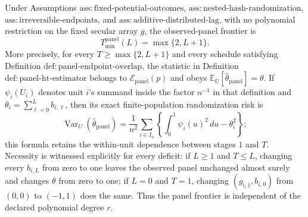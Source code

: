 Under Assumptions \(\mathrm{ass:fixed\text{-}potential\text{-}outcomes}\), \(\mathrm{ass:nested\text{-}hash\text{-}randomization}\), \(\mathrm{ass:irreversible\text{-}endpoints}\), and \(\mathrm{ass:additive\text{-}distributed\text{-}lag}\), with no polynomial restriction on the fixed secular array \(g\), the observed-panel frontier is
\[
 T_{\min}^{\mathrm{panel}}(L)=\max\{2,L+1\}.
\]
More precisely, for every \(T\ge\max\{2,L+1\}\) and every schedule satisfying Definition \(\mathrm{def:panel\text{-}endpoint\text{-}overlap}\), the statistic in Definition \(\mathrm{def:panel\text{-}ht\text{-}estimator}\) belongs to \(\mathcal E_{\mathrm{panel}}(p)\) and obeys \(\mathbb E_U[\widehat\theta_{\mathrm{panel}}]=\theta\).  If \(\psi_i(U_i)\) denotes unit \(i\)'s summand inside the factor \(n^{-1}\) in that definition and \(\theta_i=\sum_{\ell=0}^{L}b_{i,\ell}\), then its exact finite-population randomization risk is
\[
 \operatorname{Var}_U(\widehat\theta_{\mathrm{panel}})
 =\frac1{n^2}\sum_{i\in I_n}
 \left\{\int_0^1\psi_i(u)^2\,du-\theta_i^2\right\};
\]
this formula retains the within-unit dependence between stages \(1\) and \(T\).  Necessity is witnessed explicitly for every deficit: if \(L\ge1\) and \(T\le L\), changing every \(b_{i,L}\) from zero to one leaves the observed panel unchanged almost surely and changes \(\theta\) from zero to one; if \(L=0\) and \(T=1\), changing \((g_{i,1},b_{i,0})\) from \((0,0)\) to \((-1,1)\) does the same.  Thus the panel frontier is independent of the declared polynomial degree \(r\).
